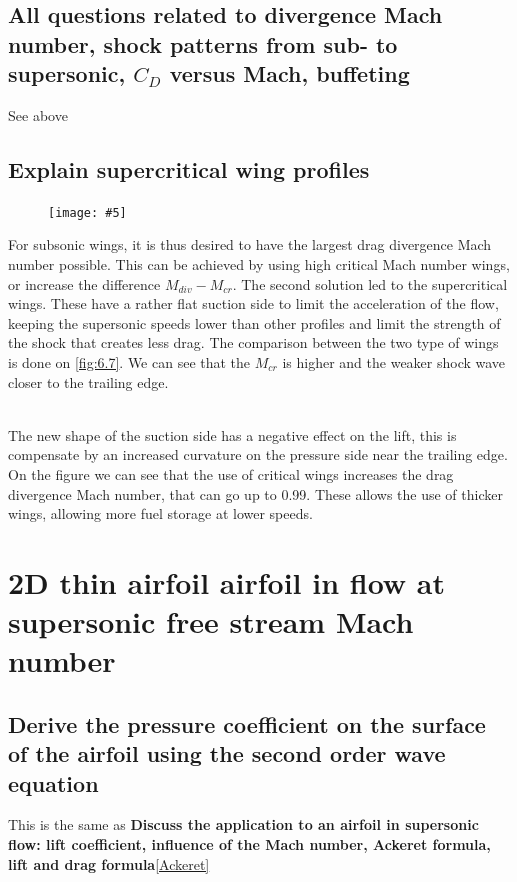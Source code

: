 \documentclass[british,french,11pt, a4paper, openany]{article}
\newcommand{\wrapfig}[6]{%
	\begin{figure}%
		\vspace{-5mm}%
		\texttt{[image: \#5]}%
		\captionof{figure}{}%
		\label{#6}%
	\end{figure}%
}
\begin{document}
\subsection{All questions related to divergence Mach number, shock patterns from sub- to supersonic, $C_D$ versus Mach, buffeting}
See above

\subsection{Explain supercritical wing profiles}

\wrapfig{16}{l}{9.5}{0.15}{ch6/7}{fig:6.7}
For subsonic wings, it is thus desired to have the largest drag divergence Mach number possible. This can be achieved by using high critical Mach number wings, or increase the difference  $M_{div} -M_{cr}$. The second solution led to the supercritical wings. These have a rather flat suction side to limit the acceleration of the flow, keeping the supersonic speeds lower than other profiles and limit the strength of the shock that creates less drag. The comparison between the two type of wings is done on \autoref{fig:6.7}. We can see that the $M_{cr}$ is higher and the weaker shock wave closer to the trailing edge. 

\ \\ The new shape of the suction side has a negative effect on the lift, this is compensate by an increased curvature on the pressure side near the trailing edge. On the figure we can see that the use of critical wings increases the drag divergence Mach number, that can go up to 0.99. These allows the use of thicker wings, allowing more fuel storage at lower speeds. 


\section{2D thin airfoil airfoil in flow at supersonic free stream Mach number}
\subsection{Derive the pressure coefficient on the surface of the airfoil using the second	order wave equation}
This is the same as \og\textbf{Discuss the application to an airfoil in supersonic flow: lift coefficient, influence of the Mach number, Ackeret formula, lift and drag formula}\fg\ref{Ackeret}
\end{document}
